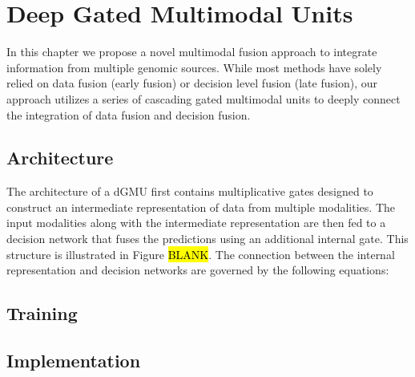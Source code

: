 \chapter{Deep Gated Multimodal Units} \label{chap:deepgmu}

In this chapter we propose a novel multimodal fusion approach to integrate information from multiple genomic sources. While most methods have solely relied on data fusion (early fusion) or decision level fusion (late fusion), our approach utilizes a series of cascading gated multimodal units to deeply connect the integration of data fusion and decision fusion.

\section{Architecture}

The architecture of a dGMU first contains multiplicative gates designed to construct an intermediate representation of data from multiple modalities. The input modalities along with the intermediate representation are then fed to a decision network that fuses the predictions using an additional internal gate. This structure is illustrated in Figure \hl{BLANK}. The connection between the internal representation and decision networks are governed by the following equations:

\section{Training}
\section{Implementation}